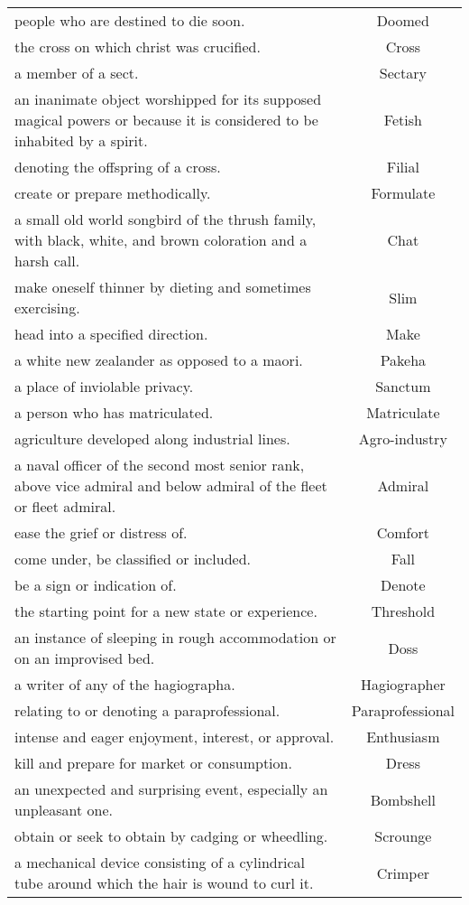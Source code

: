 \begin{longtable}{p{12cm}c}
people who are destined to die soon. & Doomed\\
the cross on which christ was crucified. & Cross\\
a member of a sect. & Sectary\\
an inanimate object worshipped for its supposed magical powers or because it is considered to be inhabited by a spirit. & Fetish\\
denoting the offspring of a cross. & Filial\\
create or prepare methodically. & Formulate\\
a small old world songbird of the thrush family, with black, white, and brown coloration and a harsh call. & Chat\\
make oneself thinner by dieting and sometimes exercising. & Slim\\
head into a specified direction. & Make\\
a white new zealander as opposed to a maori. & Pakeha\\
a place of inviolable privacy. & Sanctum\\
a person who has matriculated. & Matriculate\\
agriculture developed along industrial lines. & Agro-industry\\
a naval officer of the second most senior rank, above vice admiral and below admiral of the fleet or fleet admiral. & Admiral\\
ease the grief or distress of. & Comfort\\
come under, be classified or included. & Fall\\
be a sign or indication of. & Denote\\
the starting point for a new state or experience. & Threshold\\
an instance of sleeping in rough accommodation or on an improvised bed. & Doss\\
a writer of any of the hagiographa. & Hagiographer\\
relating to or denoting a paraprofessional. & Paraprofessional\\
intense and eager enjoyment, interest, or approval. & Enthusiasm\\
kill and prepare for market or consumption. & Dress\\
an unexpected and surprising event, especially an unpleasant one. & Bombshell\\
obtain or seek to obtain by cadging or wheedling. & Scrounge\\
a mechanical device consisting of a cylindrical tube around which the hair is wound to curl it. & Crimper\\

\end{longtable}
